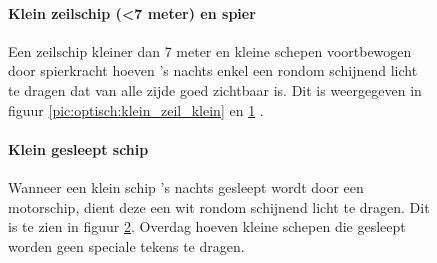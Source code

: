 \begin{figure}[H]
	\centering
	\begin{minipage}[t]{0.50\textwidth}
		\paragraph{Klein zeilschip (<7 meter) en spier}
		Een zeilschip kleiner dan 7 meter en kleine schepen voortbewogen door spierkracht hoeven 's nachts enkel een rondom schijnend licht te dragen dat van alle zijde goed zichtbaar is. Dit is weergegeven in figuur  \ref{pic:optisch:klein_zeil_klein} en \ref{pic:optisch:klein_spier} .
	\end{minipage}
	\hfill
	\begin{minipage}[t]{0.22\textwidth}
		\RemoveLine
		\caption{}
		\label{pic:optisch:klein_zeil_klein}
	\end{minipage}
	\hfill
	\begin{minipage}[t]{0.22\textwidth}
		\RemoveLine
		\caption{}
		\label{pic:optisch:klein_spier}
	\end{minipage}
\end{figure}%

\begin{figure}[H]
	\centering
	\begin{minipage}[t]{0.75\textwidth}
		\paragraph{Klein gesleept schip}
		Wanneer een klein schip 's nachts gesleept wordt door een motorschip, dient deze een wit rondom schijnend licht te dragen. Dit is te zien in figuur \ref{pic:optisch:klein_sleep}. Overdag hoeven kleine schepen die gesleept worden geen speciale tekens te dragen.
	\end{minipage}
	\hfill
	\begin{minipage}[t]{0.22\textwidth}
		\RemoveLine
		\caption{}
		\label{pic:optisch:klein_sleep}
	\end{minipage}
\end{figure}

